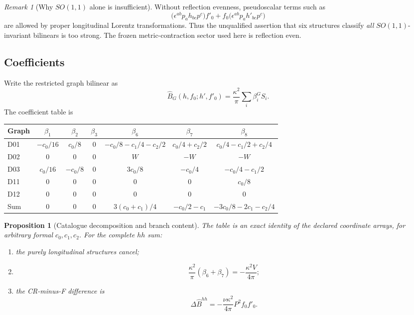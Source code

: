 \documentclass[11pt,a4paper]{article}
\newcommand{\ka}{\kappa}
\theoremstyle{plain}
\newtheorem{proposition}[theorem]{Proposition}
\theoremstyle{definition}
\theoremstyle{remark}
\newtheorem{remark}[theorem]{Remark}
\numberwithin{equation}{section}
\begin{document}
\begin{remark}[Why \(SO(1,1)\) alone is insufficient]
Without reflection evenness, pseudoscalar terms such as
\[
 \bigl(\epsilon^{ab}p_a h_{bc}p^c\bigr)f'_0
 +f_0\bigl(\epsilon^{ab}p_a h'_{bc}p^c\bigr)
\]
are allowed by proper longitudinal Lorentz transformations.
Thus the unqualified assertion that six structures classify
\emph{all} \(SO(1,1)\)-invariant bilinears is too strong.
The frozen metric-contraction sector used here is
reflection even.
\end{remark}

\subsection{Coefficients}

Write the restricted graph bilinear as
\[
 \widehat B_G(h,f_0;h',f'_0)
 =\frac{\ka^2}{\pi}\sum_i\beta_i^G S_i.
\]
The coefficient table is
\begin{center}
\scriptsize
\setlength{\tabcolsep}{4pt}
\begin{tabular}{@{}lcccccc@{}}
\toprule
Graph & \(\beta_1\)&\(\beta_2\)&\(\beta_3\)&
\(\beta_6\)&\(\beta_7\)&\(\beta_8\)\\
\midrule
D01&
\(-c_0/16\)&\(c_0/8\)&\(0\)&
\(-c_0/8-c_1/4-c_2/2\)&
\(c_0/4+c_2/2\)&
\(c_0/4-c_1/2+c_2/4\)\\
D02&\(0\)&\(0\)&\(0\)&\(W\)&\(-W\)&\(-W\)\\
D03&
\(c_0/16\)&\(-c_0/8\)&\(0\)&
\(3c_0/8\)&\(-c_0/4\)&\(-c_0/4-c_1/2\)\\
D11&\(0\)&\(0\)&\(0\)&\(0\)&\(0\)&\(c_0/8\)\\
D12&\(0\)&\(0\)&\(0\)&\(0\)&\(0\)&\(0\)\\
\midrule
Sum&\(0\)&\(0\)&\(0\)&
\(3(c_0+c_1)/4\)&\(-c_0/2-c_1\)&
\(-3c_0/8-2c_1-c_2/4\)\\
\bottomrule
\end{tabular}
\end{center}

\begin{proposition}[Catalogue decomposition and branch content]
\label{prop:decomposition}
The table is an exact identity of the declared coordinate arrays,
for arbitrary formal \(c_0,c_1,c_2\).
For the complete \(hh\) sum:
\begin{enumerate}[label=\textup{(\roman*)}]
\item the purely longitudinal structures cancel;
\item
\[
 \frac{\ka^2}{\pi}(\beta_6+\beta_7)
 =-\frac{\ka^2V}{4\pi};
\]
\item the CR-minus-F difference is
\begin{equation}
 \Delta\widehat B^{hh}
 =-\frac{\nu\ka^2}{4\pi}P^2f_0f'_0.
 \label{eq:branchdifference}
\end{equation}
\end{enumerate}
\end{proposition}
\end{document}
